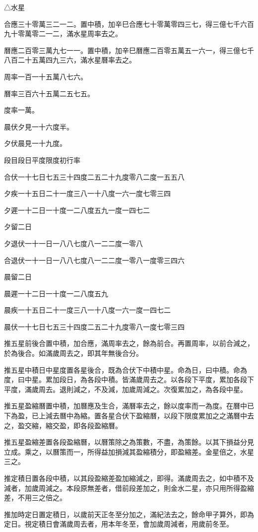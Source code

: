 △水星

合應三十零萬三二一二。置中積，加辛巳合應七十零萬零四三七，得三億七千六百九十零萬零二一二，滿水星周率去之。

曆應二百零三萬九七一一。置中積，加辛巳曆應二百零五萬五一六一，得三億七千八百二十五萬四九三六，滿水星曆率去之。

周率一百一十五萬八七六。

曆率三百六十五萬二五七五。

度率一萬。

晨伏夕見一十六度半。

夕伏晨見一十九度。

段目段日平度限度初行率

合伏一十七日七五三十四度二五二十九度零八二度一五五八

夕疾一十五日二十一度三八一十八度一六一度七零三四

夕遲一十二日一十度一二八度五九一度一四七二

夕留二日

夕退伏一十一日一八八七度八一二二度一零八

合退伏一十一日一八八七度八一二二度一零八一度零三四六

晨留二日

晨遲一十二日一十度一二八度五九

晨疾一十五日二十一度三八一十八度一六一度一四七二

晨伏一十七日七五三十四度二五二十九度零八一度七零三四

推五星前後合置中積，加合應，滿周率去之，餘為前合。再置周率，以前合減之，於為後合。如滿歲周去之，即其年無後合分。

推五星中積日中星度置各星後合，既為合伏下中積中星。命為日，曰中積。命為度，曰中星。累加段日，為各段中積。皆滿歲周去之。以各段下平度，累加各段下平度，滿歲周去。退則減之，不及減，加歲周減之。次復累加之，為各段中星。

推五星盈縮曆置中積，加曆應及生合，滿曆率去之，餘以度率而一為度。在曆中已下為盈，已上減去曆中為縮。置各星合伏下盈縮曆，以段下限度累加之之滿曆中去之，盈交縮，縮交盈，即各段盈縮曆。

推五星盈縮差置各段盈縮曆，以曆策除之為策數，不盡，為策餘。以其下損益分見立成。乘之，以曆策而一，所得益加損減其盈縮積分，即盈縮差。金星倍之，水星三之。

推定積日置各段中積，以其段盈縮差盈加縮減之，即得。滿歲周去之，如中積不及減者，加歲周減之。本段原無差者，借前段差加之，則金水二星，亦只用所得盈縮差，不用三之倍之。

推加時定日置定積日，以歲前天正冬至分加之，滿紀法去之，餘命甲子算外，即為定日。視定積日會滿歲周去者，用本年冬至，會加歲周減者，用歲前冬至。


